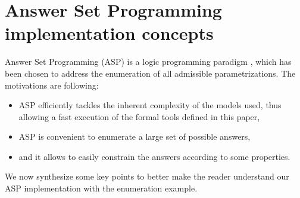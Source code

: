 \section{Answer Set Programming implementation concepts}


\newcommand{\ti}[1]{\texttt{\textit{#1}}}
\newcommand{\aspil}[1]{\texttt{#1}}
\newcommand{\asp}[1]{\begin{itemize} \item[] \aspil{#1} \end{itemize}}

\newcommand{\atom}[1]{#1}
\newcommand{\predicate}[1]{#1}
\newcommand{\la}{\leftarrow}
\newcommand{\var}[1]{#1}
\newcommand{\nota}{\neg}

\newcommand{\paramlabel}{\predicate{param\_label}}
\newcommand{\paramres}{\predicate{param\_resource}}
\newcommand{\component}{\predicate{component}}
\newcommand{\componentlevels}{\predicate{component\_levels}}
\newcommand{\param}{\predicate{param}}
\newcommand{\inferedparam}{\predicate{infered\_param}}
\newcommand{\lessactive}{\predicate{less\_active}}
\newcommand{\paraminf}{\predicate{param\_inf}}



Answer Set Programming (ASP) is a logic programming paradigm \cite{Baral03},
which has been chosen to address the enumeration of all admissible parametrizations.
The motivations are following:
\begin{itemize}
  \item ASP efficiently tackles the inherent complexity of the models used, thus allowing a fast execution of the formal tools defined in this paper,
  \item ASP is convenient to enumerate a large set of possible answers,
  \item and it allows to easily constrain the answers according to some properties.
\end{itemize}
We now synthesize some key points to better make the reader understand our ASP implementation with the enumeration example.

